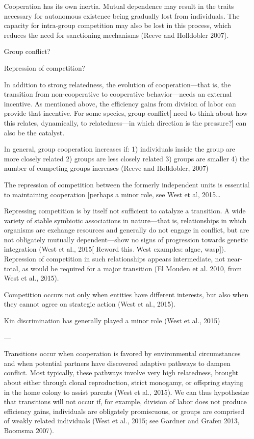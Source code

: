\documentclass{tufte-book} %
\begin{document}
Cooperation has its own inertia. Mutual dependence may result in the traits necessary for autonomous existence being gradually lost from individuals. The capacity for intra-group competition may also be lost in this process, which reduces the need for sanctioning mechanisms (Reeve and Holldobler 2007). 



Group conflict?

Repression of competition?

In addition to strong relatedness, the evolution of cooperation—that is, the transition from non-cooperative to cooperative behavior—needs an external incentive. As mentioned above, the efficiency gains from division of labor can provide that incentive. For some species, group conflict[ need to think about how this relates, dynamically, to relatedness—in which direction is the pressure?] can also be the catalyst. 

In general, group cooperation increases if:
1) individuals inside the group are more closely related
2) groups are less closely related
3) groups are smaller
4) the number of competing groups increases (Reeve and Holldobler, 2007)

The repression of competition between the formerly independent units is essential to maintaining cooperation [perhaps a minor role, see West et al, 2015…

Repressing competition is by itself not sufficient to catalyze a transition. A wide variety of stable symbiotic associations in nature—that is, relationships in which organisms are exchange resources and generally do not engage in conflict, but are not obligately mutually dependent—show no signs of progression towards genetic integration (West et al., 2015[ Reword this. West examples: algae, wasp]). Repression of competition in such relationships appears intermediate, not near-total, as would be required for a major transition (El Mouden et al. 2010, from West et al., 2015). 

Competition occurs not only when entities have different interests, but also when they cannot agree on strategic action (West et al., 2015).

Kin discrimination has generally played a minor role (West et al., 2015)

—

Transitions occur when cooperation is favored by environmental circumstances and when potential partners have discovered adaptive pathways to dampen conflict. Most typically, these pathways involve very high relatedness, brought about either through clonal reproduction, strict monogamy, or offspring staying in the home colony to assist parents (West et al., 2015). We can thus hypothesize that transitions will not occur if, for example, division of labor does not produce efficiency gains, individuals are obligately promiscuous, or groups are comprised of weakly related individuals (West et al., 2015; see Gardner and Grafen 2013, Boomsma 2007). 
\end{document}
